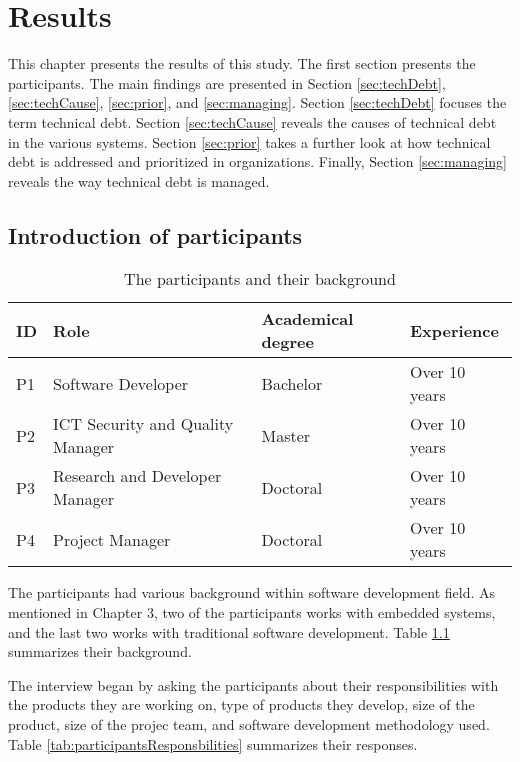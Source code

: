 \chapter{Results}
This chapter presents the results of this study. The first section presents the participants. The main findings are presented in Section \ref{sec:techDebt}, \ref{sec:techCause}, \ref{sec:prior}, and \ref{sec:managing}. Section \ref{sec:techDebt} focuses the term technical debt. Section \ref{sec:techCause} reveals the causes of technical debt in the various systems. Section \ref{sec:prior} takes a further look at how technical debt is addressed and prioritized in organizations. Finally, Section \ref{sec:managing} reveals the way technical debt is managed.

\section{Introduction of participants}
\label{sec:background}

\begin{table}[ht!]
	\centering
    \begin{tabular}{|p{1cm}|p{4cm}|p{4cm}|p{4cm}|}
    \hline
    \textbf{ID} & \textbf{Role} & \textbf{Academical degree} & \textbf{Experience}    \\ \hline
    P1 & Software Developer               & Bachelor          & Over 10 years \\ \hline
    P2 & ICT Security and Quality Manager & Master            & Over 10 years \\ \hline
    P3 & Research and Developer Manager   & Doctoral          & Over 10 years \\ \hline
    P4 & Project Manager                  & Doctoral          & Over 10 years \\ \hline
    \end{tabular}
    \caption{The participants and their background} \label{tab:participants}
\end{table}

The participants had various background within software development field. As mentioned in Chapter 3, two of the participants works with embedded systems, and the last two works with traditional software development. Table \ref{tab:participants} summarizes their background.

The interview began by asking the participants about their responsibilities with the products they are working on, type of products they develop, size of the product, size of the projec team, and software development methodology used. Table \ref{tab:participantsResponsbilities} summarizes their responses.

